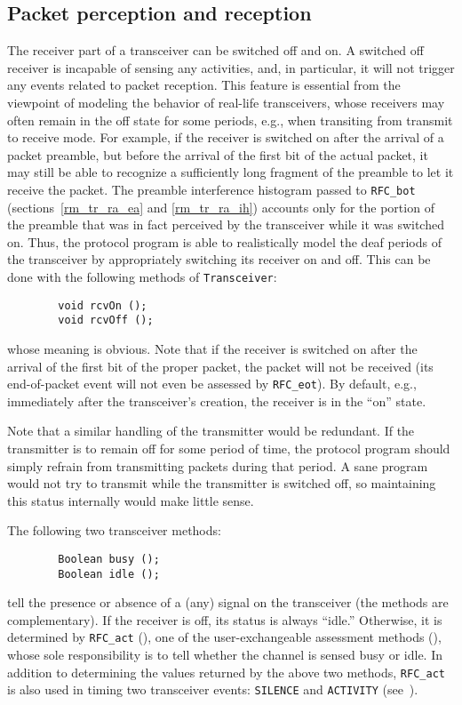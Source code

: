 \subsection{Packet perception and reception}
\label{rm_tr_pp}

The receiver part of a transceiver can be switched off and on.
A switched off receiver is incapable of sensing any activities,
and, in particular, it will not trigger any events related to packet reception.
This feature is essential from the viewpoint of modeling the
behavior of real-life transceivers, whose receivers may often remain in
the off state for some periods, e.g., when transiting from transmit
to receive mode.
For example, if the receiver is switched on after the arrival of a packet
preamble, but before the arrival of the first bit of the actual packet,
it may still be able to recognize a sufficiently long fragment of the
preamble to let it receive the packet.
The preamble interference histogram passed to {\tt RFC\_bot}
(sections~\ref{rm_tr_ra_ea} and \ref{rm_tr_ra_ih}) accounts only for the
portion of the preamble that was in fact perceived by the transceiver
while it was switched on.
Thus, the protocol program is able to realistically model the deaf
periods of the transceiver by appropriately switching its receiver on and
off.
This can be done with the following methods of {\tt Transceiver}:
\begin{verbatim}
        void rcvOn ();
        void rcvOff ();
\end{verbatim}
\noindent
whose meaning is obvious.
Note that if the receiver is switched on after the arrival of the first bit
of the proper packet, the packet will not be received (its end-of-packet
event will not even be assessed by {\tt RFC\_eot}).
By default, e.g., immediately after the transceiver's creation, the
receiver is in the ``on'' state.

Note that a similar handling of the transmitter would be redundant.
If the transmitter is to remain off for some period of time, the protocol
program should simply refrain from transmitting packets during that period.
A sane program would not try to transmit while the transmitter is switched
off, so maintaining this status internally would make little sense.

The following two transceiver methods:
\begin{verbatim}
        Boolean busy ();
        Boolean idle ();
\end{verbatim}
\noindent
tell the presence or absence of a (any) signal on the transceiver
(the methods are complementary).
If the receiver is off, its status is always ``idle.''
Otherwise, it is determined by {\tt RFC\_act}
(), one of the user-exchangeable
assessment methods (), whose
sole responsibility is to tell whether the channel is sensed busy or idle.
In addition to determining the values returned by the above two methods,
{\tt RFC\_act} is also used in timing two transceiver events:
{\tt SILENCE} and {\tt ACTIVITY} (see~).

